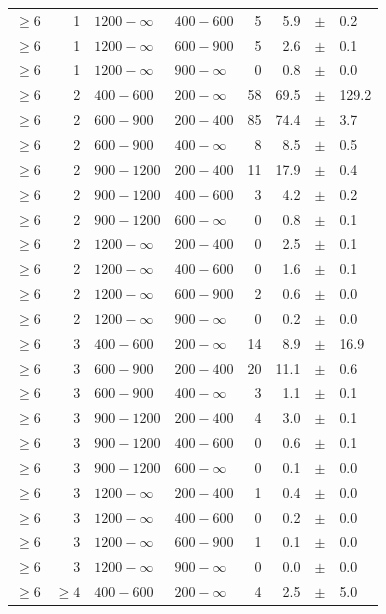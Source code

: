 \begin{table}[!h]
\begin{tabular}{rrllrrcl}
$\geq 6$ & 1 & $1200- \infty$ & $400-600$ &      5 &      5.9 &$\pm$&    0.2 \\
$\geq 6$ & 1 & $1200- \infty$ & $600-900$ &      5 &      2.6 &$\pm$&    0.1 \\
$\geq 6$ & 1 & $1200- \infty$ & $900-\infty$ &      0 &      0.8 &$\pm$&    0.0 \\
$\geq 6$\T & 2 & $ 400- 600$ & $200-\infty$ &     58 &     69.5 &$\pm$&  129.2 \\
$\geq 6$\T & 2 & $ 600- 900$ & $200-400$ &     85 &     74.4 &$\pm$&    3.7 \\
$\geq 6$ & 2 & $ 600- 900$ & $400-\infty$ &      8 &      8.5 &$\pm$&    0.5 \\
$\geq 6$\T & 2 & $ 900-1200$ & $200-400$ &     11 &     17.9 &$\pm$&    0.4 \\
$\geq 6$ & 2 & $ 900-1200$ & $400-600$ &      3 &      4.2 &$\pm$&    0.2 \\
$\geq 6$ & 2 & $ 900-1200$ & $600-\infty$ &      0 &      0.8 &$\pm$&    0.1 \\
$\geq 6$\T & 2 & $1200- \infty$ & $200-400$ &      0 &      2.5 &$\pm$&    0.1 \\
$\geq 6$ & 2 & $1200- \infty$ & $400-600$ &      0 &      1.6 &$\pm$&    0.1 \\
$\geq 6$ & 2 & $1200- \infty$ & $600-900$ &      2 &      0.6 &$\pm$&    0.0 \\
$\geq 6$ & 2 & $1200- \infty$ & $900-\infty$ &      0 &      0.2 &$\pm$&    0.0 \\
$\geq 6$\T & 3 & $ 400- 600$ & $200-\infty$ &     14 &      8.9 &$\pm$&   16.9 \\
$\geq 6$\T & 3 & $ 600- 900$ & $200-400$ &     20 &     11.1 &$\pm$&    0.6 \\
$\geq 6$ & 3 & $ 600- 900$ & $400-\infty$ &      3 &      1.1 &$\pm$&    0.1 \\
$\geq 6$\T & 3 & $ 900-1200$ & $200-400$ &      4 &      3.0 &$\pm$&    0.1 \\
$\geq 6$ & 3 & $ 900-1200$ & $400-600$ &      0 &      0.6 &$\pm$&    0.1 \\
$\geq 6$ & 3 & $ 900-1200$ & $600-\infty$ &      0 &      0.1 &$\pm$&    0.0 \\
$\geq 6$\T & 3 & $1200- \infty$ & $200-400$ &      1 &      0.4 &$\pm$&    0.0 \\
$\geq 6$ & 3 & $1200- \infty$ & $400-600$ &      0 &      0.2 &$\pm$&    0.0 \\
$\geq 6$ & 3 & $1200- \infty$ & $600-900$ &      1 &      0.1 &$\pm$&    0.0 \\
$\geq 6$ & 3 & $1200- \infty$ & $900-\infty$ &      0 &      0.0 &$\pm$&    0.0 \\
$\geq 6$\T & $\geq 4$ & $ 400- 600$ & $200-\infty$ &      4 &      2.5 &$\pm$&    5.0 \\
    \hline
  \end{tabular}
\end{table}


